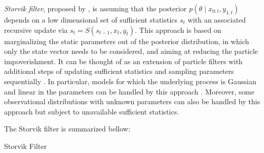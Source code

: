 \textit{Storvik filter}, proposed by \cite{storvik2002particle}, is assuming that the posterior $p(\theta\mid x_{0:t},y_{1:t})$ depends on a low dimensional set of sufficient statistics $s_t$ with an associated recursive update via $s_t=S(s_{t-1},x_t,y_t)$. This approach is based on marginalizing the static parameters out of the posterior distribution, in which only the state vector needs to be considered, and aiming at reducing the particle impoverishment. It can be thought of as an extension of particle filters with additional steps of updating sufficient statistics and sampling parameters sequentially \citep{lopes2011particle}. In particular, models for which the underlying process is Gaussian and linear in the parameters can be handled by this approach \citep{storvik2002particle}. Moreover, some observational distributions with unknown parameters can also be handled by this approach but subject to unavailable sufficient statistics. 

The Storvik filter is summarized bellow:
\begin{algorithm}[h]
\SetAlgoLined 
\caption{Storvik Filter}\label{algorithmStFilter}
\end{algorithm}


